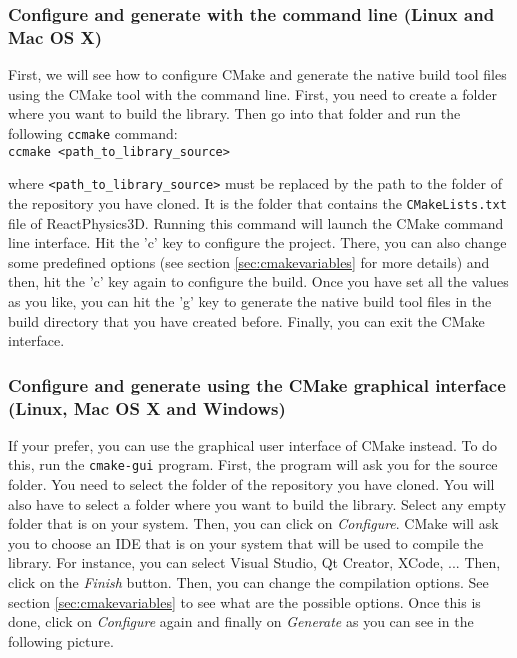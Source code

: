 \documentclass[a4paper,12pt]{article}
\begin{document}
    \subsubsection{Configure and generate with the command line (Linux and Mac OS X)}

    First, we will see how to configure CMake and generate the native build tool files using the CMake tool with the command line.
    First, you need to create a folder where you want to build the library. Then go into that folder and run the following \texttt{ccmake} command: \\

    \texttt{ccmake \textless path\_to\_library\_source\textgreater} \\

    \begin{sloppypar}
    where \texttt{\textless path\_to\_library\_source\textgreater} must be replaced
    by the path to the  folder of the repository you have cloned. It is the folder that
    contains the \texttt{CMakeLists.txt} file of ReactPhysics3D. Running this command will launch the CMake command line interface.
    Hit the 'c' key to configure the project. There, you can also change some predefined options (see section \ref{sec:cmakevariables} for more details)
    and then, hit the 'c' key again to configure the build. Once you have set all the values as you like, you can hit the 'g' key to generate the
    native build tool files in the build directory that you have created before. Finally, you can exit the CMake interface. \\
    \end{sloppypar}

    \subsubsection{Configure and generate using the CMake graphical interface (Linux, Mac OS X and Windows)}

     If your prefer, you can use the graphical user interface of CMake instead. To do this,
     run the \texttt{cmake-gui} program. First, the program will ask you for the
     source folder. You need to select the  folder of the repository you have cloned. You will also have to select a
     folder where you want to
     build the library. Select any empty folder that is on your system. Then, you can click on \emph{Configure}. CMake will ask you to
     choose an IDE that is on your system that will be used to compile the library. For instance, you can select Visual Studio,
     Qt Creator, XCode, ... Then, click on the \emph{Finish} button. Then, you can change the compilation options. See
     section \ref{sec:cmakevariables} to see what are the possible options.
     Once this is done, click on \emph{Configure} again and finally on \emph{Generate} as you can see in the following picture. \\
\end{document}
